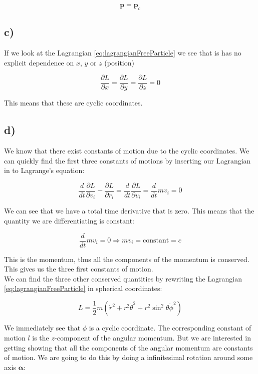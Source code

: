 \documentclass[a4paper,norsk, 10pt]{article}
\begin{document}
$$
\mathbf{p} = \mathbf{p}_c
$$

\subsection*{c)}

If we look at the Lagrangian \eqref{eq:lagrangianFreeParticle} we see that is has no explicit dependence on $x$, $y$ or $z$ (position)

$$
\frac{\partial L}{\partial x} = \frac{\partial L}{\partial y} = \frac{\partial L}{\partial z} = 0
$$

This means that these are cyclic coordinates.

\subsection*{d)}

We know that there exist constants of motion due to the cyclic coordinates. We can quickly find the first three constants of motions by inserting our Lagrangian in to Lagrange's equation:

\begin{equation}
\frac{d}{dt}\frac{\partial L}{\partial v_i} - \frac{\partial L}{\partial r_i} = \frac{d}{dt}\frac{\partial L}{\partial v_i} = \frac{d}{dt} mv_i = 0
\end{equation}

We can see that we have a total time derivative that is zero. This means that the quantity we are differentiating is constant:

\begin{equation}
\frac{d}{dt} mv_i = 0 \Rightarrow mv_i = \text{constant} = c
\end{equation}

This is the momentum, thus all the components of the momentum is conserved. This gives us the three first constants of motion.\\

We can find the three other conserved quantities by rewriting the Lagrangian \eqref{eq:lagrangianFreeParticle} in spherical coordinates:

\begin{equation}
L = \frac{1}{2}m(\dot{r}^2 + r^2\dot{\theta}^2 +r^2\sin^2\theta\dot{\phi}^2)
\label{eq:lagrangianSpherical}
\end{equation}

We immediately see that $\phi$ is a cyclic coordinate. The corresponding constant of motion $l$ is the $z$-component of the angular momentum. But we are interested in getting showing that all the components of the angular momentum are constants of motion. We are going to do this by doing a infinitesimal rotation around some axis $\mathbf{\alpha}$:
\end{document}
